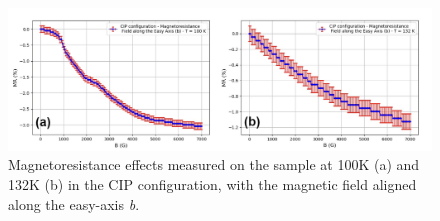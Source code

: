 \documentclass[journal]{IEEEtran}
\begin{document}
\begin{figure}[h!]
    \centering
    \includegraphics[width=\linewidth]{MR_at_T.png}
    \caption{Magnetoresistance effects measured on the sample at 100K (a) and 132K (b) in the CIP configuration, with the magnetic field aligned along the easy-axis \textit{b}.}
    \label{fig:MR_at_T}
\end{figure}
\end{document}
